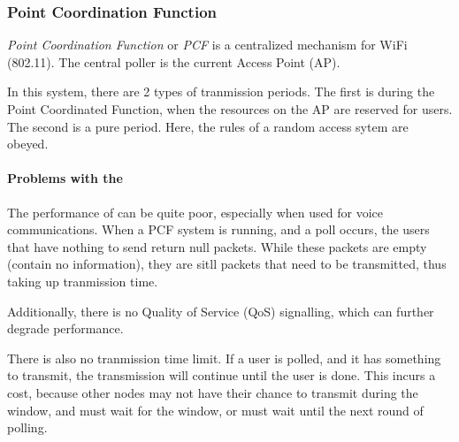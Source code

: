 \subsubsection{Point Coordination Function}\label{subsubsec:Point_Coordination_Function}
\begin{definition}\label{def:PCF}
  \emph{Point Coordination Function} or \emph{PCF} is a centralized  mechanism for WiFi (802.11).
  The central poller is the current Access Point (AP).

  In this system, there are 2 types of tranmission periods.
  The first is during the Point Coordinated Function, when the resources on the AP are reserved for users.
  The second is a pure  period.
  Here, the rules of a random access sytem are obeyed.
\end{definition}

\paragraph{Problems with the }\label{par:PCF_Problems}
The performance of  can be quite poor, especially when used for voice communications.
When a PCF system is running, and a poll occurs, the users that have nothing to send return null packets.
While these packets are empty (contain no information), they are sitll packets that need to be transmitted, thus taking up tranmission time.

Additionally, there is no Quality of Service (QoS) signalling, which can further degrade performance.

There is also no tranmission time limit.
If a user is polled, and it has something to transmit, the transmission will continue until the user is done.
This incurs a cost, because other nodes may not have their chance to transmit during the  window, and must wait for the  window, or must wait until the next round of polling.

